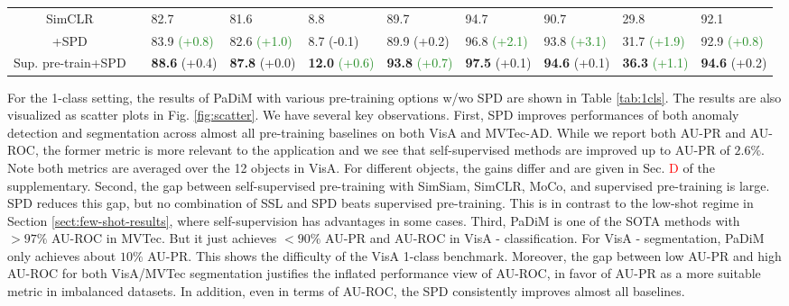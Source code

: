 \documentclass[runningheads]{llncs}
\newcommand{\cmark}{\ding{51}}\newcommand{\xmark}{\ding{55}}\usepackage[colorlinks]{hyperref}
\begin{document}
\begin{table*}[!t]
{\begin{tabular}{c|c|llll||llll}
    SimCLR               & \xmark & 82.7 & \multicolumn{1}{l|}{81.6}  & 8.8  & 89.7   & 94.7 & \multicolumn{1}{l|}{90.7}  & 29.8 & 92.1  \\
    +SPD                 & \xmark & 83.9 \textcolor{forestgreen}{(+0.8)} & \multicolumn{1}{l|}{82.6 \textcolor{forestgreen}{(+1.0)}}  & 8.7 (-0.1) & 89.9 (+0.2) & 96.8 \textcolor{forestgreen}{(+2.1)} & \multicolumn{1}{l|}{93.8 \textcolor{forestgreen}{(+3.1)}}  & 31.7 \textcolor{forestgreen}{(+1.9)} & 92.9 \textcolor{forestgreen}{(+0.8)} \\ \hline
    Sup. pre-train+SPD & \cmark & \textbf{88.6} (+0.4) & \multicolumn{1}{l|}{\textbf{87.8} (+0.0)}  & \textbf{12.0} \textcolor{forestgreen}{(+0.6)} & \textbf{93.8} \textcolor{forestgreen}{(+0.7)}  & \textbf{97.5} (+0.1) & \multicolumn{1}{l|}{\textbf{94.6} (+0.1)}  & \textbf{36.3} \textcolor{forestgreen}{(+1.1)} & \textbf{94.6} (+0.2) \\ \hline 
    \end{tabular}
	}
\end{table*}

For the 1-class setting, the results of PaDiM with various pre-training options w/wo SPD are shown in Table \ref{tab:1cls}. The results are also visualized as scatter plots in Fig. \ref{fig:scatter}. We have several key observations. First, SPD improves performances of both anomaly detection and segmentation across almost all pre-training baselines on both VisA and MVTec-AD. While we report both AU-PR and AU-ROC, the former metric is more relevant to the application and we see that self-supervised methods are improved up to AU-PR of $2.6\%$. Note both metrics are averaged over the 12 objects in VisA. For different objects, the gains differ and are given in Sec. \textcolor{red}{D} of the supplementary. Second, the gap between self-supervised pre-training with SimSiam, SimCLR, MoCo, and supervised pre-training is large. SPD reduces this gap, but no combination of SSL and SPD beats supervised pre-training. This is in contrast to the low-shot regime in Section \ref{sect:few-shot-results}, where self-supervision has advantages in some cases. Third, PaDiM is one of the SOTA methods with $>97\%$ AU-ROC in MVTec. But it just achieves $<90\%$ AU-PR and AU-ROC in VisA - classification. For VisA - segmentation, PaDiM only achieves about $10\%$ AU-PR. This shows the difficulty of the VisA 1-class benchmark. Moreover, the gap between low AU-PR and high AU-ROC for both VisA/MVTec segmentation justifies the inflated performance view of AU-ROC, in favor of AU-PR as a more suitable metric in imbalanced datasets. In addition, even in terms of AU-ROC, the SPD consistently improves almost all baselines. 
\end{document}
